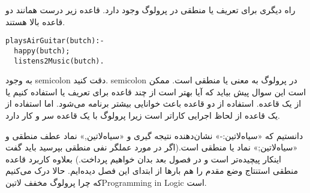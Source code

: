 راه دیگری برای تعریف یا منطقی در پرولوگ وجود دارد. قاعده زیر درست همانند دو قاعده بالا هستند.

\begin{latin}
\begin{lstlisting}
playsAirGuitar(butch):-
  happy(butch);
  listens2Music(butch).
\end{lstlisting}
\end{latin}

به وجود semicolon دقت کنید. semicolon در پرولوگ به معنی یا منطقی است. ممکن است این سوال پیش بیاید که آیا بهتر است از چند قاعده برای تعریف یا استفاده کنیم یا از یک قاعده. استفاده از دو قاعده باعث خوانایی بیشتر برنامه می‌شود. اما استفاده از یک قاعده از لحاظ اجرایی کاراتر است زیرا پرولوگ با یک قاعده سر و کار دارد.

دانستیم که «‌سیاه{‌لاتین{:-}}» نشان‌دهنده نتیجه گیری و «‌سیاه{‌لاتین{,}}» نماد عطف منطقی و «‌سیاه{‌لاتین{;}}» نماد یا منطقی است.(اگر در مورد عملگر نفی منطقی بپرسید باید گفت اینکار پیچیده‌تر است و در فصول بعد بدان خواهیم پرداخت.) بعلاوه کاربرد قاعده منطقی استنتاج وضع مقدم را هم بارها از ابتدای این فصل دیده‌ایم. حالا درک می‌کنیم که چرا پرولوگ مخفف ‌لاتین{Programming in Logic} است.

